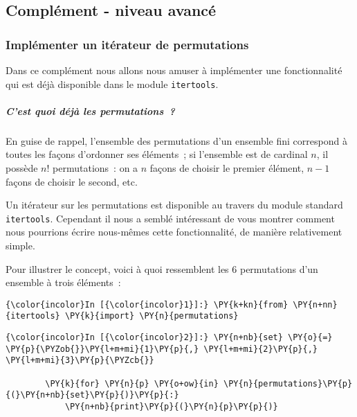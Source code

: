     
    
    
    

    

    \hypertarget{compluxe9ment---niveau-avancuxe9}{%
\subsection{Complément - niveau
avancé}\label{compluxe9ment---niveau-avancuxe9}}

    \hypertarget{impluxe9menter-un-ituxe9rateur-de-permutations}{%
\subsubsection{Implémenter un itérateur de
permutations}\label{impluxe9menter-un-ituxe9rateur-de-permutations}}

    Dans ce complément nous allons nous amuser à implémenter une
fonctionnalité qui est déjà disponible dans le module
\texttt{itertools}.

    \hypertarget{cest-quoi-duxe9juxe0-les-permutations}{%
\subparagraph{C'est quoi déjà les
permutations~?}\label{cest-quoi-duxe9juxe0-les-permutations}}

    En guise de rappel, l'ensemble des permutations d'un ensemble fini
correspond à toutes les façons d'ordonner ses éléments~; si l'ensemble
est de cardinal \(n\), il possède \(n!\) permutations~: on a \(n\)
façons de choisir le premier élément, \(n-1\) façons de choisir le
second, etc.

    Un itérateur sur les permutations est disponible au travers du module
standard \texttt{itertools}. Cependant il nous a semblé intéressant de
vous montrer comment nous pourrions écrire nous-mêmes cette
fonctionnalité, de manière relativement simple.

    Pour illustrer le concept, voici à quoi ressemblent les 6 permutations
d'un ensemble à trois éléments~:

    \begin{Verbatim}[commandchars=\\\{\},frame=single,framerule=0.3mm,rulecolor=\color{cellframecolor}]
{\color{incolor}In [{\color{incolor}1}]:} \PY{k+kn}{from} \PY{n+nn}{itertools} \PY{k}{import} \PY{n}{permutations}
\end{Verbatim}


    \begin{Verbatim}[commandchars=\\\{\},frame=single,framerule=0.3mm,rulecolor=\color{cellframecolor}]
{\color{incolor}In [{\color{incolor}2}]:} \PY{n+nb}{set} \PY{o}{=} \PY{p}{\PYZob{}}\PY{l+m+mi}{1}\PY{p}{,} \PY{l+m+mi}{2}\PY{p}{,} \PY{l+m+mi}{3}\PY{p}{\PYZcb{}}
        
        \PY{k}{for} \PY{n}{p} \PY{o+ow}{in} \PY{n}{permutations}\PY{p}{(}\PY{n+nb}{set}\PY{p}{)}\PY{p}{:}
            \PY{n+nb}{print}\PY{p}{(}\PY{n}{p}\PY{p}{)}
\end{Verbatim}


